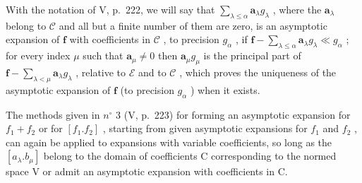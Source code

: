 With the notation of V, p.~222, we will say that \(\sum_{\lambda \leqslant \alpha} \mathbf{a}_{\lambda} g_{\lambda}\) , where the \(\mathbf{a}_{\lambda}\) belong to \(\mathcal{C}\) and all but a finite number of them are zero, is an asymptotic expansion of \(\mathbf{f}\) with coefficients in \(\mathcal{C}\) , to precision \(g_{\alpha}\) , if \(\mathbf{f} - \sum_{\lambda \leqslant \alpha} \mathbf{a}_{\lambda} g_{\lambda} \ll g_{\alpha}\) ; for every index \(\mu\) such that \(\mathbf{a}_{\mu} \neq 0\) then \(\mathbf{a}_{\mu} g_{\mu}\) is the principal part of \(\mathbf{f} - \sum_{\lambda < \mu} \mathbf{a}_{\lambda} g_{\lambda}\) , relative to \(\mathcal{E}\) and to \(\mathcal{C}\) , which proves the uniqueness of the asymptotic expansion of \(\mathbf{f}\) (to precision \(g_{\alpha}\) ) when it exists.

The methods given in \(n^{\circ}\) 3 (V, p.~223) for forming an asymptotic expansion for \(f_{1} + f_{2}\) or for \([f_{1}.f_{2}]\) , starting from given asymptotic expansions for \(f_{1}\) and \(f_{2}\) , can again be applied to expansions with variable coefficients, so long as the \([a_{\lambda}.b_{\mu}]\) belong to the domain of coefficients C corresponding to the normed space V or admit an asymptotic expansion with coefficients in C.

